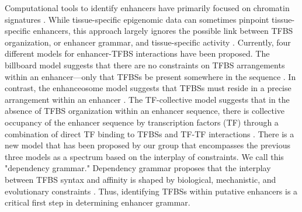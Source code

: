 Computational tools to identify enhancers have primarily focused on chromatin signatures \cite{meuleman2020,zinzen2009}. While tissue-specific epigenomic data can sometimes pinpoint tissue-specific enhancers, this approach largely ignores the possible link between TFBS organization, or enhancer grammar, and tissue-specific activity \cite{jindal2021,grossman2017,ryan2020,king2020a,halfon2019}. Currently, four different models for enhancer-TFBS interactions have been proposed. The billboard model suggests that there are no constraints on TFBS arrangements within an enhancer—only that TFBSs be present somewhere in the sequence \cite{liu2012a,kulkarni2003,jindal2021}. In contrast, the enhanceosome model suggests that TFBSs must reside in a precise arrangement within an enhancer \cite{bazett-jones1994,thanos1995,panne2007,melnikov2012,jindal2021}. The TF-collective model suggests that in the absence of TFBS organization within an enhancer sequence, there is collective occupancy of the enhancer sequence by transcription factors (TF) through a combination of direct TF binding to TFBSs and TF-TF interactions \cite{junion2012,jindal2021}. There is a new model that has been proposed by our group that encompasses the previous three models as a spectrum based on the interplay of constraints. We call this "dependency grammar." Dependency grammar proposes that the interplay between TFBS syntax and affinity is shaped by biological, mechanistic, and evolutionary constraints \cite{jindal2021}. Thus, identifying TFBSs within putative enhancers is a critical first step in determining enhancer grammar. 

